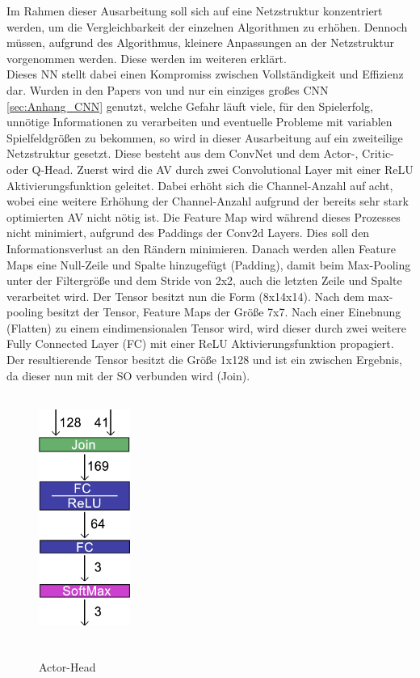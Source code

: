 Im Rahmen dieser Ausarbeitung soll sich auf eine Netzstruktur konzentriert werden, um die Vergleichbarkeit der einzelnen Algorithmen zu erhöhen. Dennoch müssen, aufgrund des Algorithmus, kleinere Anpassungen an der Netzstruktur vorgenommen werden. Diese werden im weiteren erklärt.\\
Dieses NN stellt dabei einen Kompromiss zwischen Vollständigkeit und Effizienz dar. Wurden in den Papers von \cite{Autonomous_Agents_in_Snake_Game_via_DRL} und \cite{UAV} nur ein einziges großes CNN \ref{sec:Anhang_CNN} genutzt, welche Gefahr läuft viele, für den Spielerfolg, unnötige Informationen zu verarbeiten und eventuelle Probleme mit variablen Spielfeldgrößen zu bekommen, so wird in dieser Ausarbeitung auf ein zweiteilige Netzstruktur gesetzt. Diese besteht aus dem ConvNet und dem Actor-, Critic- oder Q-Head.
Zuerst wird die AV durch zwei Convolutional Layer mit einer ReLU Aktivierungsfunktion geleitet. Dabei erhöht sich die Channel-Anzahl auf acht, wobei eine weitere Erhöhung der Channel-Anzahl aufgrund der bereits sehr stark optimierten AV nicht nötig ist. Die Feature Map wird während dieses Prozesses nicht minimiert, aufgrund des Paddings der Conv2d Layers. Dies soll den Informationsverlust an den Rändern minimieren.  
Danach werden allen Feature Maps eine Null-Zeile und Spalte hinzugefügt (Padding), damit beim Max-Pooling unter der Filtergröße und dem Stride von 2x2, auch die letzten Zeile und Spalte verarbeitet wird. Der Tensor besitzt nun die Form (8x14x14). Nach dem max-pooling besitzt der Tensor, Feature Maps der Größe 7x7. Nach einer Einebnung (Flatten) zu einem eindimensionalen Tensor wird, wird dieser durch zwei weitere Fully Connected Layer (FC) mit einer ReLU Aktivierungsfunktion propagiert. Der resultierende Tensor besitzt die Größe 1x128 und ist ein zwischen Ergebnis, da dieser nun mit der SO verbunden wird (Join).
\begin{figure}
	\centering
	\includegraphics[width=3.0cm, height=8.0cm]{Abbildungen/Actor.png}
	\caption[Actor-Head]{\\Actor-Head}
	\label{fig:Actor_Head}
\end{figure}

